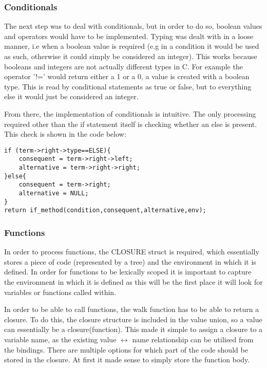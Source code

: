 \documentclass[11pt]{article}
\begin{document}
\subsubsection{Conditionals}

The next step was to deal with conditionals, but in order to do so, boolean values and operators would have to be implemented. Typing was dealt with in a loose manner, i.e when a boolean value is required (e.g in a condition it would be used as such, otherwise it could simply be considered an integer). This works because booleans and integers are not actually different types in C. For example the operator '!=' would return either a 1 or a 0, a value is created with a boolean type. This is read by conditional statements as true or false, but to everything else it would just be considered an integer. 

From there, the implementation of conditionals is intuitive. The only processing required other than the if statement itself is checking whether an else is present. This check is shown in the code below:

\begin{lstlisting}
if (term->right->type==ELSE){
 	consequent = term->right->left;
 	alternative = term->right->right;
}else{
 	consequent = term->right;
 	alternative = NULL;
}
return if_method(condition,consequent,alternative,env);
\end{lstlisting}

\subsubsection{Functions}

In order to process functions, the CLOSURE struct is required, which essentially stores a piece of code (represented by a tree) and the environment in which it is defined. In order for functions to be lexically scoped it is important to capture the environment in which it is defined as this will be the first place it will look for variables or functions called within. 

In order to be able to call functions, the walk function has to be able to return a closure. To do this, the closure structure is included in the value union, so a value can essentially be a closure(function). This made it simple to assign a closure to a variable name, as the existing value $\leftrightarrow$ name relationship can be utilised from the bindings. There are multiple options for which part of the code should be stored in the closure. At first it made sense to simply store the function body. 
\end{document}
